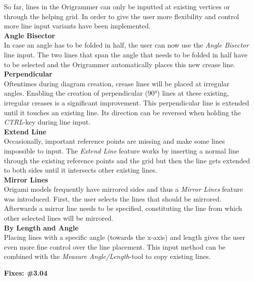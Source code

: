 So far, lines in the Origrammer can only be inputted at existing vertices or through the helping grid. In order to give the user more flexibility and control more line input variants have been implemented.\\
\newline
\noindent \textbf{Angle Bisector}\\
\noindent In case an angle has to be folded in half, the user can now use the \emph{Angle Bisector} line input. The two lines that span the angle that needs to be folded in half have to be selected and the Origrammer automatically places this new crease line.\\
\newline
\noindent \textbf{Perpendicular}\\
\noindent Oftentimes during diagram creation, crease lines will be placed at irregular angles. Enabling the creation of perpendicular (90°) lines at these existing, irregular creases is a significant improvement. This perpendicular line is extended until it touches an existing line. Its direction can be reversed when holding the \emph{CTRL}-key during line input.\\
\newline
\noindent \textbf{Extend Line}\\
\noindent Occasionally, important reference points are missing and make some lines impossible to input. The \emph{Extend Line} feature works by inserting a normal line through the existing reference points and the grid but then the line gets extended to both sides until it intersects other existing lines.\\
\newline
\noindent \textbf{Mirror Lines}\\
\noindent Origami models frequently have mirrored sides and thus a \emph{Mirror Lines} feature was introduced. First, the user selects the lines that should be mirrored. Afterwards a mirror line needs to be specified, constituting the line from which other selected lines will be mirrored.\\
\newline
\noindent \textbf{By Length and Angle}\\
\noindent Placing lines with a specific angle (towards the x-axis) and length gives the user even more fine control over the line placement. This input method can be combined with the \emph{Measure Angle/Length}-tool to copy existing lines.

\textbf{Fixes: \#3.04}